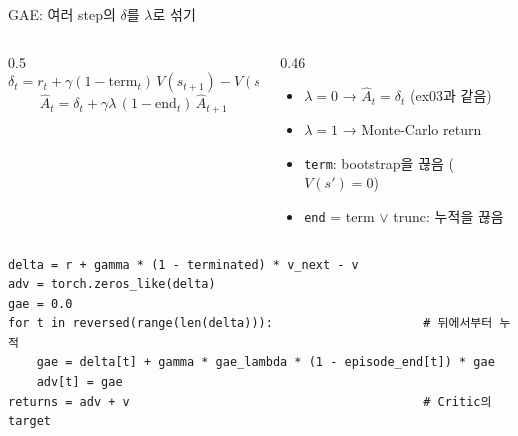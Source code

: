 \documentclass[aspectratio=169,11pt,xcolor=table]{beamer}
\newcommand{\cc}[1]{\texttt{#1}}
\begin{document}
\begin{frame}[fragile]{GAE: 여러 step의 $\delta$를 $\lambda$로 섞기}
  \begin{columns}[T,onlytextwidth]
    \begin{column}{0.5\textwidth}
      \[ \delta_t = r_t + \gamma (1 - \text{term}_t)\, V(s_{t+1}) - V(s_t) \]
      \[ \hat A_t = \delta_t + \gamma\lambda\, (1 - \text{end}_t)\, \hat A_{t+1} \]
    \end{column}
    \begin{column}{0.46\textwidth}
      \begin{itemize}\small
        \item $\lambda = 0$ → $\hat A_t = \delta_t$ (ex03과 같음)
        \item $\lambda = 1$ → Monte-Carlo return
        \item \cc{term}: bootstrap을 끊음 ($V(s')=0$)
        \item \cc{end} = term $\lor$ trunc: 누적을 끊음
      \end{itemize}
    \end{column}
  \end{columns}
  \vspace{0.8em}
\begin{lstlisting}
delta = r + gamma * (1 - terminated) * v_next - v
adv = torch.zeros_like(delta)
gae = 0.0
for t in reversed(range(len(delta))):                     # 뒤에서부터 누적
    gae = delta[t] + gamma * gae_lambda * (1 - episode_end[t]) * gae
    adv[t] = gae
returns = adv + v                                         # Critic의 target
\end{lstlisting}
\end{frame}
\end{document}
